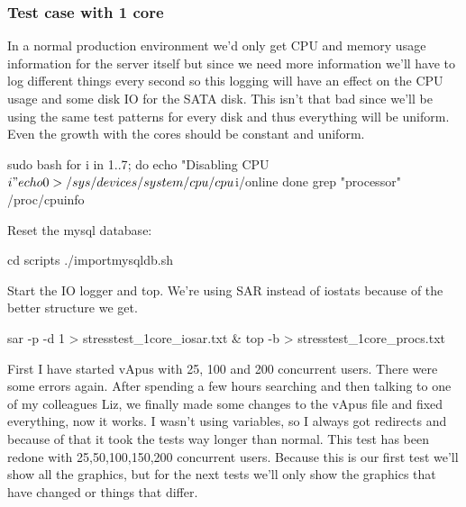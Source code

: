 \subsubsection{Test case with 1 core}
In a normal production environment we'd only get CPU and memory usage information for the server itself but since we need more information we'll have to log different things every second so this logging will have an effect on the CPU usage and some disk IO for the SATA disk. This isn't that bad since we'll be using the same test patterns for every disk and thus everything will be uniform. Even the growth with the cores should be constant and uniform.
\begin{codelisting}
sudo bash
for i in {1..7};  do
	echo "Disabling CPU$i"
	echo 0 > /sys/devices/system/cpu/cpu$i/online
done
grep "processor" /proc/cpuinfo
\end{codelisting}
Reset the \gls{mysql} database:
\begin{codelisting}
cd scripts
./importmysqldb.sh
\end{codelisting}
Start the IO logger and top. We're using SAR instead of iostats because of the better structure we get.
\begin{codelisting}
sar -p -d 1 > stresstest_1core_iosar.txt & top -b > stresstest_1core_procs.txt
\end{codelisting}

First I have started vApus with 25, 100 and 200 concurrent users. There were some errors again. After spending a few hours searching and then talking to one of my colleagues Liz, we finally made some changes to the vApus file and fixed everything, now it works. I wasn't using variables, so I always got redirects and because of that it took the tests way longer than normal. This test has been redone with 25,50,100,150,200 concurrent users.  Because this is our first test we'll show all the graphics, but for the next tests we'll only show the graphics that have changed or things that differ. 

